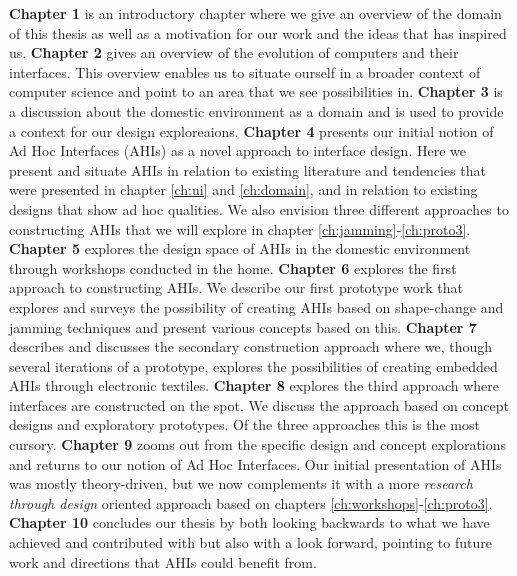 \textbf{Chapter 1} is an introductory chapter where we give an overview of the domain of this thesis as well as a motivation for our work and the ideas that has inspired us.
\blank
\textbf{Chapter 2} gives an overview of the evolution of computers and their interfaces.
This overview enables us to situate ourself in a broader context of computer science and point to an area that we see possibilities in.  
\blank
\textbf{Chapter 3} is a discussion about the domestic environment as a domain and is used to provide a context for our design exploreaions. 
\blank
\textbf{Chapter 4} presents our initial notion of Ad Hoc Interfaces (AHIs) as a novel approach to interface design.
Here we present and situate AHIs in relation to existing literature and tendencies that were presented in chapter \ref{ch:ui} and \ref{ch:domain}, and in relation to existing designs that show ad hoc qualities.
We also envision three different approaches to constructing AHIs that we will explore in chapter \ref{ch:jamming}-\ref{ch:proto3}.
\blank
\textbf{Chapter 5} explores the design space of AHIs in the domestic environment through workshops conducted in the home.
\blank
\textbf{Chapter 6} explores the first approach to constructing AHIs. 
We describe our first prototype work that explores and surveys the possibility of creating AHIs based on shape-change and jamming techniques and present various concepts based on this.
\blank
\textbf{Chapter 7} describes and discusses the secondary construction approach where we, though several iterations of a prototype, explores the possibilities of creating embedded AHIs through electronic textiles.
\blank
\textbf{Chapter 8} explores the third approach where interfaces are constructed on the spot.
We discuss the approach based on concept designs and exploratory prototypes. 
Of the three approaches this is the most cursory.
\blank
\textbf{Chapter 9} zooms out from the specific design and concept explorations and returns to our notion of Ad Hoc Interfaces.
Our initial presentation of AHIs was mostly theory-driven, but we now complements it with a more \emph{research through design} oriented approach based on chapters \ref{ch:workshops}-\ref{ch:proto3}. 
\blank
\textbf{Chapter 10} concludes our thesis by both looking backwards to what we have achieved and contributed with but also with a look forward, pointing to future work and directions that AHIs could benefit from.